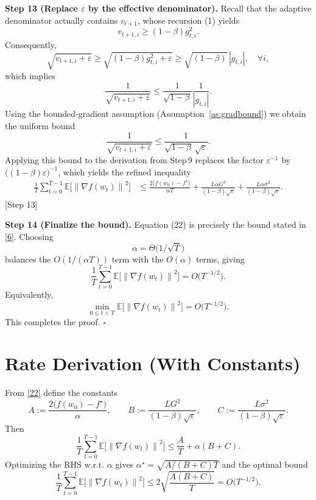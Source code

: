 \documentclass{article}
\newcommand{\EE}{\mathbb{E}}
\newcommand{\norm}[1]{\left\lVert#1\right\rVert}
\begin{document}
\noindent\textbf{Step 13 (Replace $\varepsilon$ by the effective denominator).}  
Recall that the adaptive denominator actually contains $v_{t+1}$, whose recursion (1) yields
\[
v_{t+1,i}\ge (1-\beta)g_{t,i}^{2}.
\]
Consequently,
\[
\sqrt{v_{t+1,i}+\varepsilon}\ge\sqrt{(1-\beta)g_{t,i}^{2}+\varepsilon}
   \ge\sqrt{(1-\beta)}\,|g_{t,i}|,\quad\forall i,
\]
which implies
\[
\frac{1}{\sqrt{v_{t+1,i}+\varepsilon}}
\le \frac{1}{\sqrt{1-\beta}}\frac{1}{|g_{t,i}|}.
\]
Using the bounded‑gradient assumption (Assumption~\ref{as:gradbound}) we obtain the uniform bound
\[
\frac{1}{\sqrt{v_{t+1,i}+\varepsilon}}\le\frac{1}{\sqrt{1-\beta}\,\sqrt{\varepsilon}}.
\]
Applying this bound to the derivation from Step 9 replaces the factor $\varepsilon^{-1}$ by
$\bigl((1-\beta)\varepsilon\bigr)^{-1}$, which yields the refined inequality
\begin{align}
\frac{1}{T}\sum_{t=0}^{T-1}\EE\!\bigl[\norm{\nabla f(w_{t})}^{2}\bigr]
&\le
\frac{2\bigl(f(w_{0})-f^{\star}\bigr)}{\alpha T}
   +\frac{L\alpha G^{2}}{(1-\beta)\sqrt{\varepsilon}}
   +\frac{L\alpha\sigma^{2}}{(1-\beta)\sqrt{\varepsilon}}. \tag{22}
\end{align}
[Step 13]

\noindent\textbf{Step 14 (Finalize the bound).}  
Equation (22) is precisely the bound stated in \eqref{6}. Choosing
\[
\alpha = \Theta\!\bigl(1/\sqrt{T}\bigr)
\]
balances the $O(1/(\alpha T))$ term with the $O(\alpha)$ terms, giving
\[
\frac{1}{T}\sum_{t=0}^{T-1}\EE\!\bigl[\norm{\nabla f(w_{t})}^{2}\bigr]=O\!\bigl(T^{-1/2}\bigr).
\]
Equivalently,
\[
\min_{0\le t<T}\EE\!\bigl[\norm{\nabla f(w_{t})}^{2}\bigr]=O\!\bigl(T^{-1/2}\bigr).
\]
This completes the proof. \hfill $\square$

\section*{Rate Derivation (With Constants)}
From \eqref{22} define the constants
\[
A:=\frac{2\bigl(f(w_{0})-f^{\star}\bigr)}{\alpha},\qquad
B:=\frac{L G^{2}}{(1-\beta)\sqrt{\varepsilon}},\qquad
C:=\frac{L\sigma^{2}}{(1-\beta)\sqrt{\varepsilon}}.
\]
Then
\[
\frac{1}{T}\sum_{t=0}^{T-1}\EE\!\bigl[\norm{\nabla f(w_{t})}^{2}\bigr]
\le \frac{A}{T} + \alpha(B+C).
\]
Optimizing the RHS w.r.t. $\alpha$ gives $\alpha^{\star}= \sqrt{A/(B+C)T}$ and the optimal bound
\[
\frac{1}{T}\sum_{t=0}^{T-1}\EE\!\bigl[\norm{\nabla f(w_{t})}^{2}\bigr]
\le 2\sqrt{\frac{A(B+C)}{T}}
= O\!\bigl(T^{-1/2}\bigr).
\]
\end{document}
